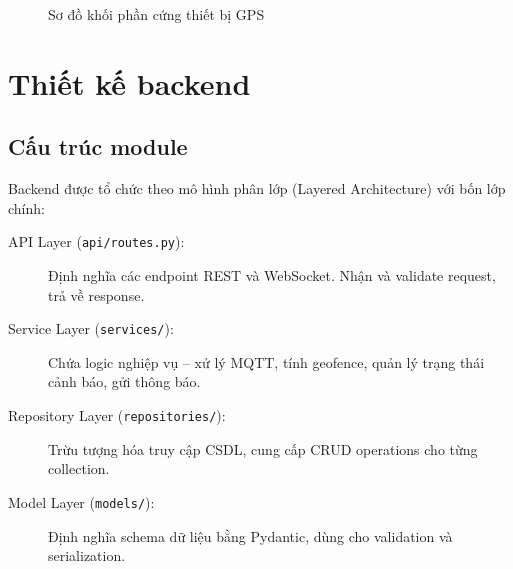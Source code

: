 \begin{figure}[H]
\centering
{}
\caption{Sơ đồ khối phần cứng thiết bị GPS}
\label{fig:hardware_block}
\end{figure}

\section{Thiết kế backend}

\subsection{Cấu trúc module}

Backend được tổ chức theo mô hình phân lớp (Layered Architecture) với bốn lớp chính:

\begin{description}
  \item[API Layer (\texttt{api/routes.py}):] Định nghĩa các endpoint REST và WebSocket. Nhận và validate request, trả về response.
  \item[Service Layer (\texttt{services/}):] Chứa logic nghiệp vụ -- xử lý MQTT, tính geofence, quản lý trạng thái cảnh báo, gửi thông báo.
  \item[Repository Layer (\texttt{repositories/}):] Trừu tượng hóa truy cập CSDL, cung cấp CRUD operations cho từng collection.
  \item[Model Layer (\texttt{models/}):] Định nghĩa schema dữ liệu bằng Pydantic, dùng cho validation và serialization.
\end{description}

